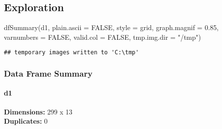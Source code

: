 \documentclass[
]{article}
\newenvironment{Shaded}{\begin{snugshade}}{\end{snugshade}}
\newcommand{\AttributeTok}[1]{\textcolor[rgb]{0.77,0.63,0.00}{#1}}
\newcommand{\ConstantTok}[1]{\textcolor[rgb]{0.00,0.00,0.00}{#1}}
\newcommand{\FloatTok}[1]{\textcolor[rgb]{0.00,0.00,0.81}{#1}}
\newcommand{\FunctionTok}[1]{\textcolor[rgb]{0.00,0.00,0.00}{#1}}
\newcommand{\NormalTok}[1]{#1}
\newcommand{\StringTok}[1]{\textcolor[rgb]{0.31,0.60,0.02}{#1}}
\begin{document}
\hypertarget{exploration}{%
\subsection{Exploration}\label{exploration}}

\begin{Shaded}
\begin{Highlighting}[]
\FunctionTok{dfSummary}\NormalTok{(d1, }\AttributeTok{plain.ascii  =} \ConstantTok{FALSE}\NormalTok{,}
          \AttributeTok{style        =} \StringTok{\textquotesingle{}grid\textquotesingle{}}\NormalTok{,}
          \AttributeTok{graph.magnif =} \FloatTok{0.85}\NormalTok{,}
          \AttributeTok{varnumbers =} \ConstantTok{FALSE}\NormalTok{,}
          \AttributeTok{valid.col    =} \ConstantTok{FALSE}\NormalTok{, }\AttributeTok{tmp.img.dir =} \StringTok{"/tmp"}\NormalTok{)}
\end{Highlighting}
\end{Shaded}

\begin{verbatim}
## temporary images written to 'C:\tmp'
\end{verbatim}

\hypertarget{data-frame-summary}{%
\subsubsection{Data Frame Summary}\label{data-frame-summary}}

\hypertarget{d1}{%
\paragraph{d1}\label{d1}}

\textbf{Dimensions:} 299 x 13\\
\textbf{Duplicates:} 0
\end{document}
